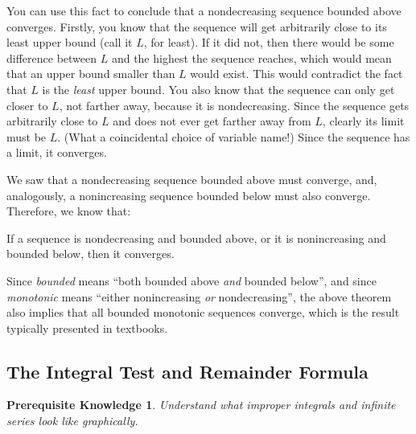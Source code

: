 \documentclass{myarticle}
\theoremstyle{nospace}
\newtheorem*{oldprereq}{Prerequisite Knowledge}
\newenvironment{prereq}{\begin{mdframed}\begin{oldprereq}}{\end{oldprereq}\end{mdframed}}
\newtheorem{old series theorem}{Theorem}
\newenvironment{series theorem}{\begin{mdframed}\begin{old series theorem}}{\end{old series theorem}\end{mdframed}}
\begin{document}
You can use this fact to conclude that a nondecreasing sequence bounded above converges. Firstly, you know that the sequence will get arbitrarily close to its least upper bound (call it $L$, for least). If it did not, then there would be some difference between $L$ and the highest the sequence reaches, which would mean that an upper bound smaller than $L$ would exist. This would contradict the fact that $L$ is the \emph{least} upper bound. You also know that the sequence can only get closer to $L$, not farther away, because it is nondecreasing. Since the sequence gets arbitrarily close to $L$ and does not ever get farther away from $L$, clearly its limit must be $L$. (What a coincidental choice of variable name!) Since the sequence has a limit, it converges.

We saw that a nondecreasing sequence bounded above must converge, and, analogously, a nonincreasing sequence bounded below must also converge. Therefore, we know that:

\begin{series theorem} If a sequence is nondecreasing and bounded above, or it is nonincreasing and bounded below, then it converges. \end{series theorem}

Since \emph{bounded} means ``both bounded above \emph{and} bounded below'', and since \emph{monotonic} means ``either nonincreasing \emph{or} nondecreasing'', the above theorem also implies that all bounded monotonic sequences converge, which is the result typically presented in textbooks.

\subsection{The Integral Test and Remainder Formula} \label{sec:integral test}

\begin{prereq} Understand what improper integrals and infinite series look like graphically. \end{prereq}
\end{document}
